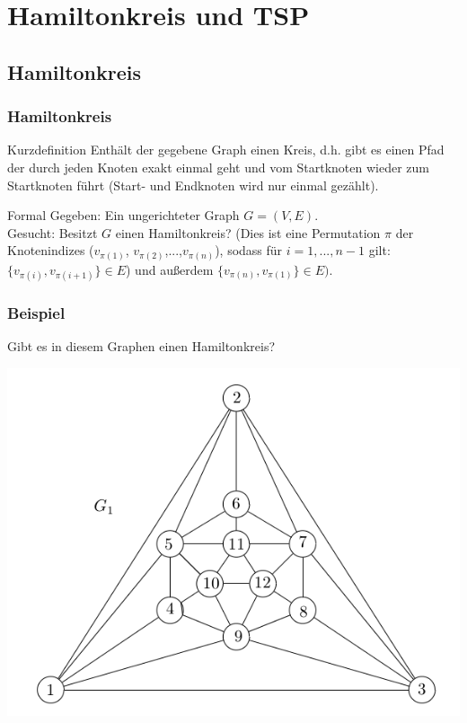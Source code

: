\section{Hamiltonkreis und TSP}
\subsection{Hamiltonkreis}
\begin{frame}
	\frametitle{Hamiltonkreis}
	\begin{block}{Kurzdefinition}
	Enthält der gegebene Graph einen Kreis, d.h. gibt es einen Pfad der durch jeden Knoten exakt einmal geht und vom Startknoten wieder zum Startknoten führt (Start- und Endknoten wird nur einmal gezählt).
	\end{block}
	\begin{block}{Formal}
	Gegeben: Ein ungerichteter Graph $G=(V,E)$.\\
	Gesucht: Besitzt $G$ einen Hamiltonkreis? (Dies ist eine Permutation $\pi$ der Knotenindizes ($v_{\pi(1)}$, $v_{\pi(2)}$,...,$v_{\pi(n)}$), sodass für $i=1,...,n-1$ gilt: $\{v_{\pi(i)},v_{\pi(i+1)}\}\in E$) und 
außerdem $\{v_{\pi(n)},v_{\pi(1)}\} \in E)$.
	\end{block}
\end{frame}
\begin{frame}
	\frametitle{Beispiel}
	Gibt es in diesem Graphen einen Hamiltonkreis?
	\begin{center}
		\includegraphics[scale=0.4]{images/4_Faerben}
	\end{center}
\end{frame}
